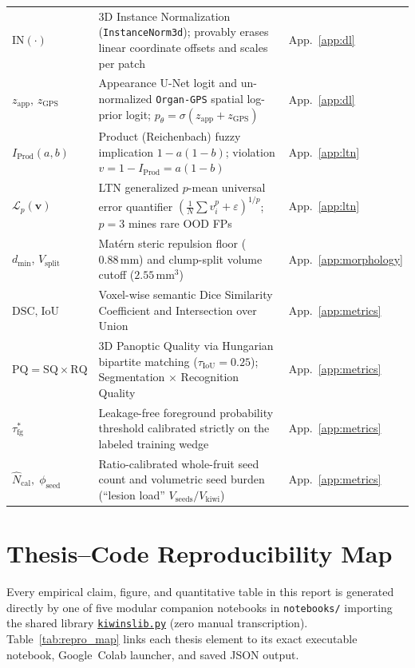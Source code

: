 \documentclass[10pt,a4paper]{article}
\renewcommand{\_}{\origunderscore\allowbreak}
\newcommand{\ghblob}{https://github.com/arvidl/BMED365-2027/blob/main}
\newcommand{\repodir}{Lab4-Comp-Imag/Kiwi-challenge/docs/neurosymbolic-report}
\newcommand{\nbref}[1]{\href{\ghblob/\repodir/notebooks/#1}{\texttt{#1}}}
\begin{document}
{\begin{xltabular}{\textwidth}{L{2.7cm} Y L{2.2cm}}
$\text{IN}(\cdot)$ & 3D Instance Normalization (\texttt{InstanceNorm3d}); provably erases linear coordinate offsets and scales per patch & App.~\ref{app:dl} \\
$z_{\text{app}},\, z_{\text{GPS}}$ & Appearance U-Net logit and un-normalized \texttt{Organ-GPS} spatial log-prior logit; $p_\theta = \sigma(z_{\text{app}} + z_{\text{GPS}})$ & App.~\ref{app:dl} \\
$I_{\text{Prod}}(a,b)$ & Product (Reichenbach) fuzzy implication $1 - a(1-b)$; violation $v = 1 - I_{\text{Prod}} = a(1-b)$ & App.~\ref{app:ltn} \\
$\mathcal{L}_p(\mathbf{v})$ & LTN generalized $p$-mean universal error quantifier $(\frac{1}{N}\sum v_i^p + \varepsilon)^{1/p}$; $p=3$ mines rare OOD FPs & App.~\ref{app:ltn} \\
$d_{\min}$, $V_{\text{split}}$ & Mat\'ern steric repulsion floor ($0.88\,\text{mm}$) and clump-split volume cutoff ($2.55\,\text{mm}^3$) & App.~\ref{app:morphology} \\
$\text{DSC},\; \text{IoU}$ & Voxel-wise semantic Dice Similarity Coefficient and Intersection over Union & App.~\ref{app:metrics} \\
$\text{PQ} = \text{SQ}\times\text{RQ}$ & 3D Panoptic Quality via Hungarian bipartite matching ($\tau_{\text{IoU}} = 0.25$); Segmentation $\times$ Recognition Quality & App.~\ref{app:metrics} \\
$\tau_{\text{fg}}^*$ & Leakage-free foreground probability threshold calibrated strictly on the labeled training wedge & App.~\ref{app:metrics} \\
$\hat{N}_{\text{cal}},\; \phi_{\text{seed}}$ & Ratio-calibrated whole-fruit seed count and volumetric seed burden (``lesion load'' $V_{\text{seeds}}/V_{\text{kiwi}}$) & App.~\ref{app:metrics} \\
\end{xltabular}
\addtocounter{table}{-1}
}

\section*{Thesis--Code Reproducibility Map}

Every empirical claim, figure, and quantitative table in this report is generated directly by one of five modular companion notebooks in \texttt{notebooks/} importing the shared library \nbref{kiwi\_ns\_lib.py} (zero manual transcription). Table~\ref{tab:repro_map} links each thesis element to its exact executable notebook, Google~Colab launcher, and saved JSON output.
\end{document}
